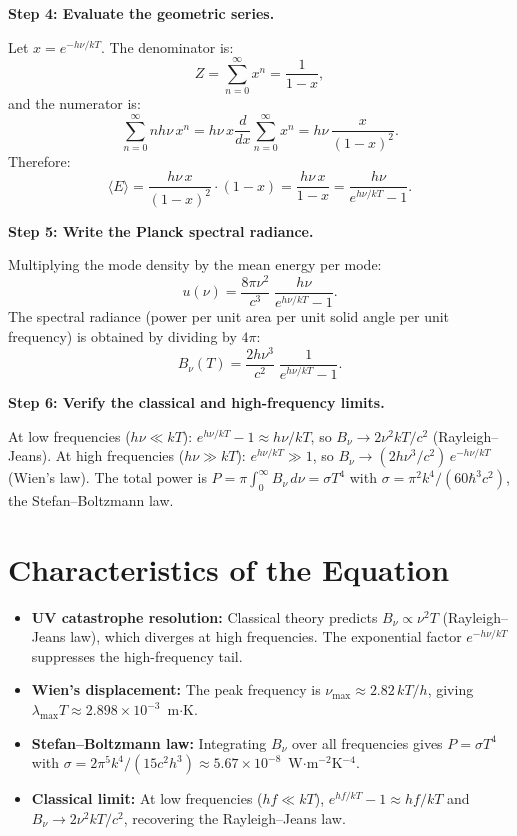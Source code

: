 \textbf{Step 4: Evaluate the geometric series.}

Let $x = e^{-h\nu/kT}$. The denominator is:
\begin{equation}
Z = \sum_{n=0}^{\infty} x^{n} = \frac{1}{1-x},
\end{equation}
and the numerator is:
\begin{equation}
\sum_{n=0}^{\infty} nh\nu\,x^{n} = h\nu\,x\frac{d}{dx}\sum_{n=0}^{\infty} x^{n} = h\nu\,\frac{x}{(1-x)^{2}}.
\end{equation}
Therefore:
\begin{equation}
\langle E \rangle = \frac{h\nu\,x}{(1-x)^{2}}\cdot(1-x) = \frac{h\nu\,x}{1-x} = \frac{h\nu}{e^{h\nu/kT}-1}.
\end{equation}

\textbf{Step 5: Write the Planck spectral radiance.}

Multiplying the mode density by the mean energy per mode:
\begin{equation}
u(\nu) = \frac{8\pi\nu^{2}}{c^{3}}\;\frac{h\nu}{e^{h\nu/kT}-1}.
\end{equation}
The spectral radiance (power per unit area per unit solid angle per unit frequency) is obtained by dividing by $4\pi$:
\begin{equation}
\boxed{\;B_{\nu}(T) = \frac{2h\nu^{3}}{c^{2}}\;\frac{1}{e^{h\nu/kT}-1}.\;}
\end{equation}

\textbf{Step 6: Verify the classical and high-frequency limits.}

At low frequencies ($h\nu \ll kT$): $e^{h\nu/kT} - 1 \approx h\nu/kT$, so $B_{\nu} \to 2\nu^{2}kT/c^{2}$ (Rayleigh--Jeans). At high frequencies ($h\nu \gg kT$): $e^{h\nu/kT} \gg 1$, so $B_{\nu} \to (2h\nu^{3}/c^{2})\,e^{-h\nu/kT}$ (Wien's law). The total power is $P = \pi\int_0^{\infty} B_{\nu}\,d\nu = \sigma T^{4}$ with $\sigma = \pi^{2}k^{4}/(60\hbar^{3}c^{2})$, the Stefan--Boltzmann law.

\section*{Characteristics of the Equation}

\begin{itemize}
  \item \textbf{UV catastrophe resolution:} Classical theory predicts $B_{\nu} \propto \nu^{2}T$ (Rayleigh--Jeans law), which diverges at high frequencies. The exponential factor $e^{-h\nu/kT}$ suppresses the high-frequency tail.
  \item \textbf{Wien's displacement:} The peak frequency is $\nu_{\text{max}} \approx 2.82\,kT/h$, giving $\lambda_{\text{max}} T \approx 2.898 \times 10^{-3}$~m$\cdot$K.
  \item \textbf{Stefan--Boltzmann law:} Integrating $B_{\nu}$ over all frequencies gives $P = \sigma T^{4}$ with $\sigma = 2\pi^{5}k^{4}/(15c^{2}h^{3}) \approx 5.67 \times 10^{-8}$~W$\cdot$m$^{-2}$K$^{-4}$.
  \item \textbf{Classical limit:} At low frequencies ($hf \ll kT$), $e^{hf/kT} - 1 \approx hf/kT$ and $B_{\nu} \to 2\nu^{2}kT/c^{2}$, recovering the Rayleigh--Jeans law.
\end{itemize}
